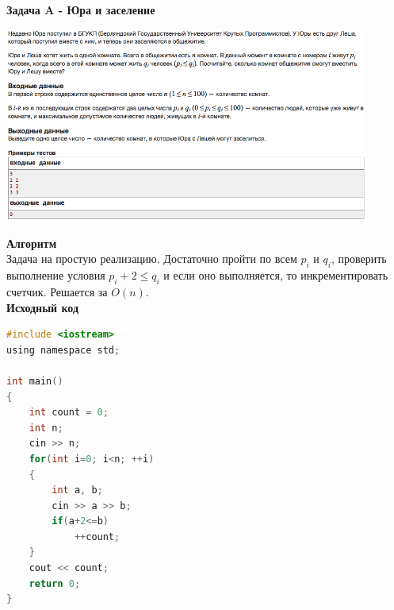 \documentclass[a4paper,12pt]{article}
\begin{document}
\textbf{{\large Задача A - Юра и заселение}} \\
\begin{center}
\includegraphics[width=0.9\textwidth]{C_267/C_267_A.png}\\ [1cm]
\end{center}
\textbf{{\large Алгоритм}} \\
Задача на простую реализацию. Достаточно пройти по всем $p_i$ и $q_i$, проверить выполнение условия $p_i + 2 \leq q_i$ и если оно выполняется, то инкрементировать счетчик. Решается за $O(n)$. \\

\textbf{{\large Исходный код}}
\begin{lstlisting}[language=C]
#include <iostream>
using namespace std;

int main()
{
    int count = 0;
    int n;
    cin >> n;
    for(int i=0; i<n; ++i)
    {
        int a, b;
        cin >> a >> b;
        if(a+2<=b)
            ++count;
    }
    cout << count;
    return 0;
}
\end{lstlisting}
\end{document}
